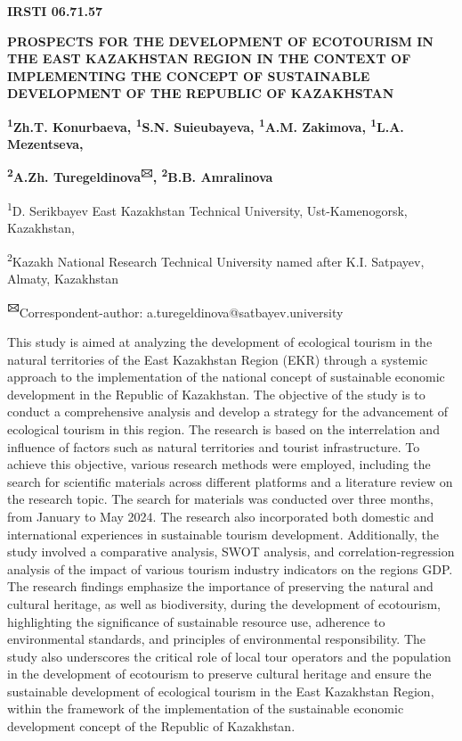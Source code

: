 
\newpage
{\bfseries IRSTI 06.71.57}

{\bfseries PROSPECTS FOR THE DEVELOPMENT OF ECOTOURISM IN THE EAST
KAZAKHSTAN REGION IN THE CONTEXT OF IMPLEMENTING THE CONCEPT OF
SUSTAINABLE DEVELOPMENT OF THE REPUBLIC OF KAZAKHSTAN}

{\bfseries \textsuperscript{1}Zh.T. Konurbaeva, \textsuperscript{1}S.N.
Suieubayeva, \textsuperscript{1}A.M. Zakimova, \textsuperscript{1}L.A.
Mezentseva,}

{\bfseries \textsuperscript{2}A.Zh. Turegeldinova\textsuperscript{🖂},
\textsuperscript{2}B.B. Amralinova}

\textsuperscript{1}D. Serikbayev East Kazakhstan Technical University,
Ust-Kamenogorsk, Kazakhstan,

\textsuperscript{2}Kazakh National Research Technical University named
after K.I. Satpayev, Almaty, Kazakhstan

{\bfseries \textsuperscript{🖂}}Correspondent-author:
a.turegeldinova@satbayev.university

This study is aimed at analyzing the development of ecological tourism
in the natural territories of the East Kazakhstan Region (EKR) through a
systemic approach to the implementation of the national concept of
sustainable economic development in the Republic of Kazakhstan. The
objective of the study is to conduct a comprehensive analysis and
develop a strategy for the advancement of ecological tourism in this
region. The research is based on the interrelation and influence of
factors such as natural territories and tourist infrastructure. To
achieve this objective, various research methods were employed,
including the search for scientific materials across different platforms
and a literature review on the research topic. The search for materials
was conducted over three months, from January to May 2024. The research
also incorporated both domestic and international experiences in
sustainable tourism development. Additionally, the study involved a
comparative analysis, SWOT analysis, and correlation-regression analysis
of the impact of various tourism industry indicators on the
region\textquotesingle s GDP. The research findings emphasize the
importance of preserving the natural and cultural heritage, as well as
biodiversity, during the development of ecotourism, highlighting the
significance of sustainable resource use, adherence to environmental
standards, and principles of environmental responsibility. The study
also underscores the critical role of local tour operators and the
population in the development of ecotourism to preserve cultural
heritage and ensure the sustainable development of ecological tourism in
the East Kazakhstan Region, within the framework of the implementation
of the sustainable economic development concept of the Republic of
Kazakhstan.

